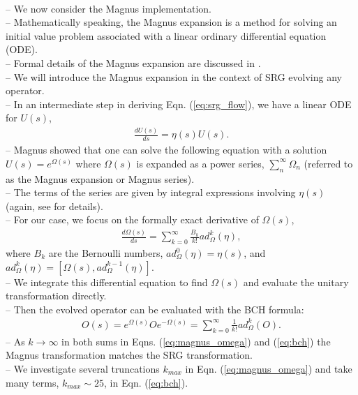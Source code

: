 \documentclass[preprintnumbers,floatfix,aps,prc,preprint,nofootinbib]{revtex4-1}
\begin{document}
\\
-- We now consider the Magnus implementation.
\\
-- Mathematically speaking, the Magnus expansion is a method for solving an initial value problem associated with a linear ordinary differential equation (ODE).
\\
-- Formal details of the Magnus expansion are discussed in \cite{Blanes:2009ab}.
\\
-- We will introduce the Magnus expansion in the context of SRG evolving any operator.
\\
-- In an intermediate step in deriving Eqn. (\ref{eq:srg_flow}), we have a linear ODE for $U(s)$,
%
\begin{eqnarray}
	\label{eq:unitary_trans}
	\frac{dU(s)}{ds} = \eta(s) U(s).
\end{eqnarray}
%
-- Magnus showed that one can solve the following equation with a solution $U(s)=e^{\Omega(s)}$ where $\Omega(s)$ is expanded as a power series, $\sum_{n}^{\infty} \Omega_n$ (referred to as the Magnus expansion or Magnus series).
\\
-- The terms of the series are given by integral expressions involving $\eta(s)$ (again, see \cite{Blanes:2009ab, Magnus:1954zz} for details).
\\
-- For our case, we focus on the formally exact derivative of $\Omega(s)$,
%
\begin{eqnarray}
	\label{eq:magnus_omega}
	\frac{d\Omega(s)}{ds} = \sum_{k=0}^{\infty} \frac{B_k}{k!} ad_{\Omega}^{k}(\eta),
\end{eqnarray}
%
where $B_k$ are the Bernoulli numbers, $ad_{\Omega}^{0}(\eta)=\eta(s)$, and $ad_{\Omega}^{k}(\eta)=[\Omega(s),ad_{\Omega}^{k-1}(\eta)]$.
\\
-- We integrate this differential equation to find $\Omega(s)$ and evaluate the unitary transformation directly.
\\
-- Then the evolved operator can be evaluated with the BCH formula:
%
\begin{eqnarray}
	\label{eq:bch}
	O(s) = e^{\Omega(s)} O e^{-\Omega(s)} = \sum_{k=0}^{\infty} \frac{1}{k!} ad_{\Omega}^{k}(O).
\end{eqnarray}
%
-- As $k \rightarrow \infty$ in both sums in Eqns. (\ref{eq:magnus_omega}) and (\ref{eq:bch}) the Magnus transformation matches the SRG transformation.
\\
-- We investigate several truncations $k_{max}$ in Eqn. (\ref{eq:magnus_omega}) and take many terms, $k_{max} \sim 25$, in Eqn. (\ref{eq:bch}).
\end{document}
